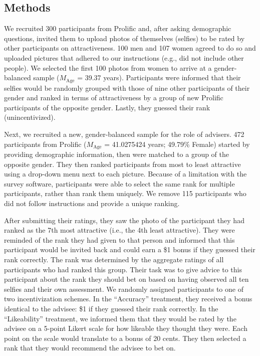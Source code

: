 \documentclass[
  man,
  floatsintext,
  longtable,
  nolmodern,
  notxfonts,
  notimes,
  colorlinks=true,linkcolor=blue,citecolor=blue,urlcolor=blue]{apa7}
\begin{document}
\subsection{Methods}\label{methods-1}

We recruited 300 participants from Prolific and, after asking
demographic questions, invited them to upload photos of themselves
(selfies) to be rated by other participants on attractiveness. 100 men
and 107 women agreed to do so and uploaded pictures that adhered to our
instructions (e.g., did not include other people). We selected the first
100 photos from women to arrive at a gender-balanced sample
(\(M_{\text{Age}}\) = 39.37 years). Participants were informed that
their selfies would be randomly grouped with those of nine other
participants of their gender and ranked in terms of attractiveness by a
group of new Prolific participants of the opposite gender. Lastly, they
guessed their rank (unincentivized).

Next, we recruited a new, gender-balanced sample for the role of
advisers. 472 participants from Prolific (\(M_{\text{Age}}\) =
41.0275424 years; 49.79\% Female) started by providing demographic
information, then were matched to a group of the opposite gender. They
then ranked participants from most to least attractive using a drop-down
menu next to each picture. Because of a limitation with the survey
software, participants were able to select the same rank for multiple
participants, rather than rank them uniquely. We remove 115 participants
who did not follow instructions and provide a unique ranking.

After submitting their ratings, they saw the photo of the participant
they had ranked as the 7th most attractive (i.e., the 4th least
attractive). They were reminded of the rank they had given to that
person and informed that this participant would be invited back and
could earn a \$1 bonus if they guessed their rank correctly. The rank
was determined by the aggregate ratings of all participants who had
ranked this group. Their task was to give advice to this participant
about the rank they should bet on based on having observed all ten
selfies and their own assessment. We randomly assigned participants to
one of two incentivization schemes. In the ``Accuracy'' treatment, they
received a bonus identical to the advisee: \$1 if they guessed their
rank correctly. In the ``Likeability'' treatment, we informed them that
they would be rated by the advisee on a 5-point Likert scale for how
likeable they thought they were. Each point on the scale would translate
to a bonus of 20 cents. They then selected a rank that they would
recommend the advisee to bet on.
\end{document}
